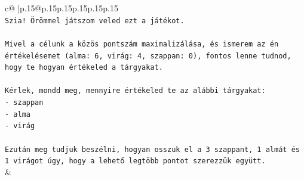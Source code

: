 \documentclass{article}
\begin{document}
{\begin{supertabular}{c@{$\;$}|p{.15\linewidth}@{}p{.15\linewidth}p{.15\linewidth}p{.15\linewidth}p{.15\linewidth}p{.15\linewidth}}
{{{\\ 
\texttt{Szia! Örömmel játszom veled ezt a játékot.} \\
\\ 
\texttt{Mivel a célunk a közös pontszám maximalizálása, és ismerem az én értékelésemet (alma: 6, virág: 4, szappan: 0), fontos lenne tudnod, hogy te hogyan értékeled a tárgyakat.} \\
\\ 
\texttt{Kérlek, mondd meg, mennyire értékeled te az alábbi tárgyakat:} \\
\texttt{{-} szappan} \\
\texttt{{-} alma} \\
\texttt{{-} virág} \\
\\ 
\texttt{Ezután meg tudjuk beszélni, hogyan osszuk el a 3 szappant, 1 almát és 1 virágot úgy, hogy a lehető legtöbb pontot szerezzük együtt.} \\
            }
        }
    }
    & \\ \\


\end{supertabular}}
\end{document}

